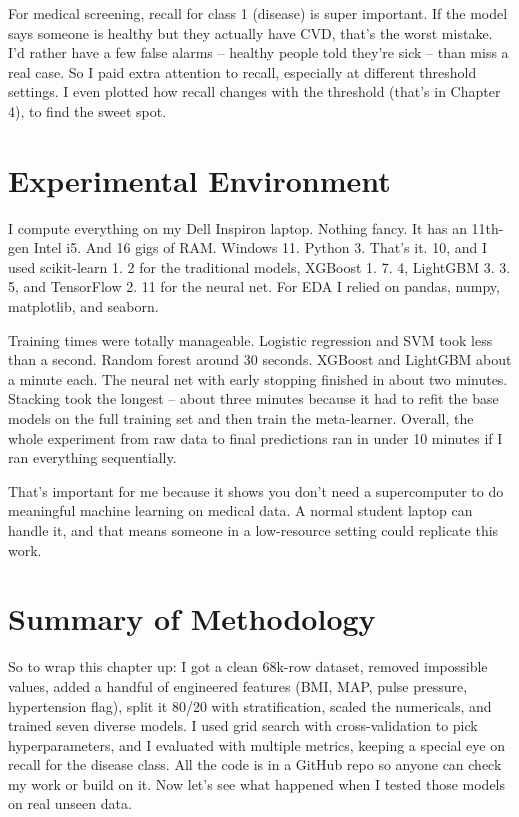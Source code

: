 \documentclass[12pt, a4paper, oneside]{book}
\begin{document}
For medical screening, recall for class 1 (disease) is super important. If the model says someone is healthy but they actually have CVD, that's the worst mistake. I'd rather have a few false alarms -- healthy people told they're sick -- than miss a real case. So I paid extra attention to recall, especially at different threshold settings. I even plotted how recall changes with the threshold (that's in Chapter 4), to find the sweet spot.

\section{Experimental Environment}
I compute everything on my Dell Inspiron laptop. Nothing fancy. It has an 11th-gen Intel i5. And 16 gigs of RAM. Windows 11. Python 3. That's it. 10, and I used scikit-learn 1. 2 for the traditional models, XGBoost 1. 7. 4, LightGBM 3. 3. 5, and TensorFlow 2. 11 for the neural net. For EDA I relied on pandas, numpy, matplotlib, and seaborn.

Training times were totally manageable. Logistic regression and SVM took less than a second. Random forest around 30 seconds. XGBoost and LightGBM about a minute each. The neural net with early stopping finished in about two minutes. Stacking took the longest -- about three minutes because it had to refit the base models on the full training set and then train the meta-learner. Overall, the whole experiment from raw data to final predictions ran in under 10 minutes if I ran everything sequentially.

That's important for me because it shows you don't need a supercomputer to do meaningful machine learning on medical data. A normal student laptop can handle it, and that means someone in a low-resource setting could replicate this work.

\section{Summary of Methodology}
So to wrap this chapter up: I got a clean 68k-row dataset, removed impossible values, added a handful of engineered features (BMI, MAP, pulse pressure, hypertension flag), split it 80/20 with stratification, scaled the numericals, and trained seven diverse models. I used grid search with cross-validation to pick hyperparameters, and I evaluated with multiple metrics, keeping a special eye on recall for the disease class. All the code is in a GitHub repo so anyone can check my work or build on it. Now let's see what happened when I tested those models on real unseen data.
\end{document}
